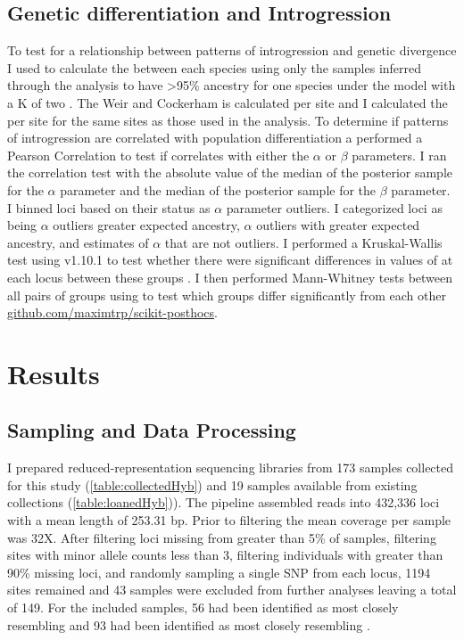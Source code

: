 \subsection{Genetic differentiation and Introgression}
To test for a relationship between patterns of introgression and genetic divergence 
I used \vcftools to calculate the \cite{weir1984} \fst between 
each species using only the samples inferred through the \structure analysis to have 
>95\% ancestry for one species under the model with a K of two \parencite{danecek2011}. 
The Weir and Cockerham \fst is calculated per site and I calculated the per site 
\fst for the same sites as those used in the \bgc analysis. 
To determine if patterns of introgression are correlated with population differentiation
a performed a Pearson Correlation to test if \fst correlates with either the
$\alpha$ or $\beta$ parameters. I ran the correlation test with the absolute  
value of the median of the posterior sample for the $\alpha$ parameter and 
the median of the posterior sample for the $\beta$ parameter.
I binned loci based on their status as $\alpha$ parameter outliers. I categorized  
loci as being $\alpha$ outliers greater expected \amer
ancestry, $\alpha$ outliers with greater expected \terr ancestry, and estimates 
of $\alpha$ that are not outliers.
I performed a Kruskal-Wallis test using \scipy v1.10.1 to test whether there were 
significant differences in values of \fst at each locus between these groups \parencite{scipy}. 
I then performed Mann-Whitney tests between all pairs of groups using \scikitpost to test which 
groups differ significantly from each other \url{github.com/maximtrp/scikit-posthocs}.


\section{Results}
\subsection{Sampling and Data Processing}
I prepared reduced-representation sequencing libraries from 173 samples collected 
for this study (\cref{table:collectedHyb}) and 19 samples available from existing 
collections (\cref{table:loanedHyb})). 
The \stacks pipeline assembled reads into 432,336 loci with a mean length of 253.31 bp.
Prior to filtering the mean coverage per sample was 32X.
After filtering loci missing from greater than 5\% of samples, filtering sites with   
minor allele counts less than 3, filtering individuals with greater than 90\% 
missing loci, and randomly sampling a single SNP from each locus, 1194 sites
remained and 43 samples were excluded from further analyses leaving a total of 149. 
For the included samples, 56 had been identified as most closely resembling \amer 
and 93 had been identified as most closely resembling \terr. 


